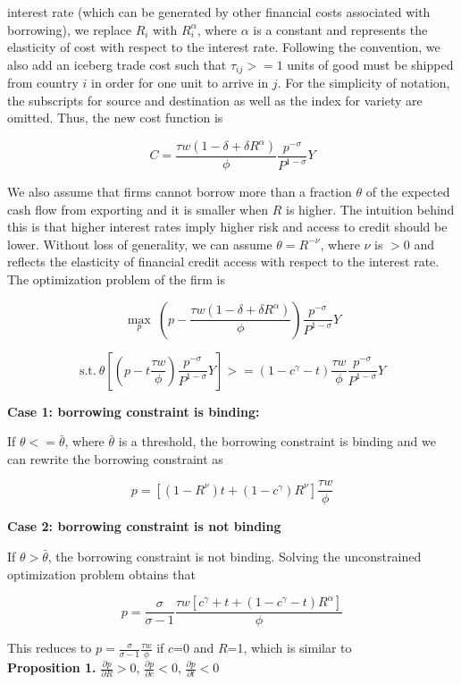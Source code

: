 \documentclass[12pt]{article}
\begin{document}
interest rate (which can be generated by other financial costs associated with borrowing), we replace $R_i$ with $R_i^\alpha$, where $\alpha$ is a constant and represents the elasticity of cost with respect to the interest rate. Following the convention, we also add an iceberg trade cost such that $\tau_{ij}>=1$ units of good must be shipped from country $i$ in order for one unit to arrive in $j$. For the simplicity of notation, the subscripts for source and destination as well as the index for variety are omitted. Thus, the new cost function is

$$ 
C=\frac{\tau w(1-\delta+\delta R^\alpha)}{\phi} \frac{p^{-\sigma}}{P^{1-\sigma}} Y
$$

We also assume that firms cannot borrow more than a fraction $\theta$ of the expected cash flow from exporting and it is smaller when $R$ is higher. The intuition behind this is that higher interest rates imply higher risk and access to credit should be lower. Without loss of generality, we can assume $\theta=R^{-\nu}$, where $\nu$ is $>0$ and reflects the elasticity of financial credit access with respect to the interest rate. The optimization problem of the firm is 

$$
\max_{p} \ (p- \frac{\tau w(1-\delta+\delta R^\alpha)}{\phi}) \frac{p^{-\sigma}}{P^{1-\sigma}} Y
$$

$$
\text{s.t.} \ \theta [(p-t \frac{\tau w}{\phi}) \frac{p^{-\sigma}}{P^{1-\sigma}} Y]>=(1-c^\gamma-t)\frac{\tau w}{\phi} \frac{p^{-\sigma}}{P^{1-\sigma}} Y
$$


\textbf{Case 1: borrowing constraint is binding: }

If $\theta<=\bar{\theta}$, where $\bar{\theta}$ is a threshold, the borrowing constraint is binding and we can rewrite the borrowing constraint as 

$$
p=[(1-R^{\nu})t+(1-c^\gamma)R^{\nu}] \frac{\tau w}{\phi}
$$

\textbf{Case 2: borrowing constraint is not binding}

If $\theta>\bar{\theta}$, the borrowing constraint is not binding. Solving the unconstrained optimization problem obtains that

$$
p=\frac{\sigma}{\sigma-1}\frac{\tau w [c^\gamma+t+(1-c^\gamma-t) R^\alpha]}{\phi}
$$

This reduces to $p=\frac{\sigma}{\sigma-1}\frac{\tau w}{\phi}$ if $c$=0 and $R$=1, which is similar to \cite{melitz2003impact} \\


\textbf{Proposition 1.} $\frac{\partial p}{\partial R}>0$, $\frac{\partial p}{\partial c}<0$, $\frac{\partial p}{\partial t}<0$
\end{document}
